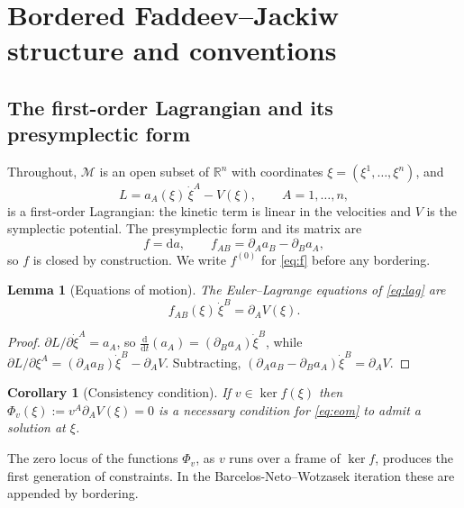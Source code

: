 \documentclass[12pt]{article}
\theoremstyle{plain}
\newtheorem{lemma}[theorem]{Lemma}
\newtheorem{corollary}[theorem]{Corollary}
\theoremstyle{definition}
\theoremstyle{remark}
\newcommand{\R}{\mathbb{R}}
\newcommand{\dd}{\mathrm{d}}
\newcommand{\pd}[1]{\partial_{#1}}
\newcommand{\Mm}{\mathcal{M}}
\begin{document}
	\section{Bordered Faddeev--Jackiw structure and conventions}
	\label{sec:conventions}
	
	\subsection{The first-order Lagrangian and its presymplectic form}
	
	Throughout, $\Mm$ is an open subset of $\R^{n}$ with coordinates
	$\xi=(\xi^{1},\dots,\xi^{n})$, and
	\begin{equation}
		L=a_{A}(\xi)\,\dot\xi^{A}-V(\xi),
		\qquad A=1,\dots,n,
		\label{eq:lag}
	\end{equation}
	is a first-order Lagrangian: the kinetic term is linear in the velocities and
	$V$ is the symplectic potential. The presymplectic form and its matrix are
	\begin{equation}
		f=\dd a,\qquad
		f_{AB}=\pd{A}a_{B}-\pd{B}a_{A},
		\label{eq:f}
	\end{equation}
	so $f$ is closed by construction. We write $f^{(0)}$ for \eqref{eq:f} before any
	bordering.
	
	\begin{lemma}[Equations of motion]
		\label{lem:eom}
		The Euler--Lagrange equations of \eqref{eq:lag} are
		\begin{equation}
			f_{AB}(\xi)\,\dot\xi^{B}=\pd{A}V(\xi).
			\label{eq:eom}
		\end{equation}
	\end{lemma}
	
	\begin{proof}
		$\partial L/\partial\dot\xi^{A}=a_{A}$, so
		$\tfrac{\dd}{\dd t}(a_{A})=(\pd{B}a_{A})\dot\xi^{B}$, while
		$\partial L/\partial\xi^{A}=(\pd{A}a_{B})\dot\xi^{B}-\pd{A}V$. Subtracting,
		$(\pd{A}a_{B}-\pd{B}a_{A})\dot\xi^{B}=\pd{A}V$.
	\end{proof}
	
	\begin{corollary}[Consistency condition]
		\label{cor:consistency}
		If $v\in\ker f(\xi)$ then $\Phi_{v}(\xi):=v^{A}\pd{A}V(\xi)=0$ is a necessary
		condition for \eqref{eq:eom} to admit a solution at $\xi$.
	\end{corollary}
	
	The zero locus of the functions $\Phi_{v}$, as $v$ runs over a frame of
	$\ker f$, produces the first generation of constraints. In the
	Barcelos-Neto--Wotzasek iteration these are appended by bordering.
	
\end{document}
